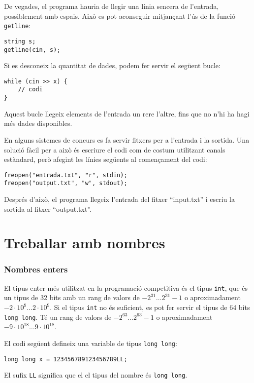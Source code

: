 De vegades, el programa hauria de llegir una línia sencera
de l'entrada, possiblement amb espais.
Això es pot aconseguir mitjançant l'ús de
la funci\'o \texttt{getline}:

\begin{lstlisting}
string s;
getline(cin, s);
\end{lstlisting}

Si es desconeix la quantitat de dades, podem fer servir el
següent bucle:
\begin{lstlisting}
while (cin >> x) {
    // codi
}
\end{lstlisting}
Aquest bucle llegeix elements de l'entrada
un rere l'altre, fins que no n'hi ha
hagi més dades disponibles.

En alguns sistemes de concurs es fa servir fitxers per
a l'entrada i la sortida.
Una solució fàcil per a això és escriure
el codi com de costum utilitzant canals estàndard,
però afegint les línies següents al començament del codi:
\begin{lstlisting}
freopen("entrada.txt", "r", stdin);
freopen("output.txt", "w", stdout);
\end{lstlisting}
Després d'això, el programa llegeix l'entrada del fitxer
``input.txt'' i escriu la sortida al fitxer
``output.txt''.

\section{Treballar amb nombres}


\subsubsection{Nombres enters}

El tipus enter més utilitzat en la programació competitiva
és el tipus \texttt{int}, que és un tipus de 32 bits amb
un rang de valors de $-2^{31} \ldots 2^{31}-1$
o aproximadament $-2 \cdot 10^9 \ldots 2 \cdot 10^9$.
Si el tipus \texttt{int} no és suficient,
es pot fer servir el tipus de 64 bits \texttt{long long}.
Té un rang de valors de $-2^{63} \ldots 2^{63}-1$
o aproximadament $-9 \cdot 10^{18} \ldots 9 \cdot 10^{18}$.

El codi següent defineix una
variable de tipus \texttt{long long}:
\begin{lstlisting}
long long x = 123456789123456789LL;
\end{lstlisting}
El sufix \texttt{LL} significa que el
el tipus del nombre és \texttt{long long}.

